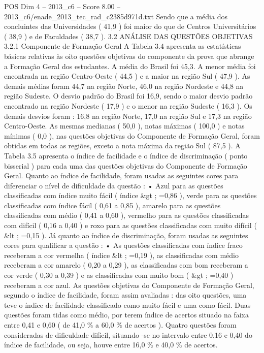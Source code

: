 \begin{textsample}{POS Dim 4 – 2013\_c6 – Score 8.00 – 2013\_c6/enade\_2013\_tec\_rad\_c2385d971d.txt}
Sendo que a média dos concluintes das Universidades ( 41,9 ) foi maior do que de Centros Universitários ( 38,9 ) e de Faculdades ( 38,7 ). 3.2 ANÁLISE DAS QUESTÕES OBJETIVAS 3.2.1 Componente de Formação Geral A Tabela 3.4 apresenta as estatísticas básicas relativas às oito questões objetivas do componente da prova que abrange a Formação Geral dos estudantes.
A média do Brasil foi 45,3.
A menor média foi encontrada na região Centro-Oeste ( 44,5 ) e a maior na região Sul ( 47,9 ).
As demais médias foram 44,7 na região Norte, 46,0 na região Nordeste e 44,8 na região Sudeste.
O desvio padrão do Brasil foi 16,9, sendo o maior desvio padrão encontrado na região Nordeste ( 17,9 ) e o menor na região Sudeste ( 16,3 ).
Os demais desvios foram : 16,8 na região Norte, 17,0 na região Sul e 17,3 na região Centro-Oeste.
As mesmas medianas ( 50,0 ), notas máximas ( 100,0 ) e notas mínimas ( 0,0 ), nas questões objetivas do Componente de Formação Geral, foram obtidas em todas as regiões, exceto a nota máxima da região Sul ( 87,5 ).
A Tabela 3.5 apresenta o índice de facilidade e o índice de discriminação ( ponto bisserial ) para cada uma das questões objetivas do Componente de Formação Geral.
Quanto ao índice de facilidade, foram usadas as seguintes cores para diferenciar o nível de dificuldade da questão : • Azul para as questões classificadas com índice muito fácil ( índice \&gt ; =0,86 ), verde para as questões classificadas com índice fácil ( 0,61 a 0,85 ), amarelo para as questões classificadas com médio ( 0,41 a 0,60 ), vermelho para as questões classificadas com difícil ( 0,16 a 0,40 ) e roxo para as questões classificadas com muito difícil ( \&lt ; =0,15 ).
Já quanto ao índice de discriminação, foram usadas as seguintes cores para qualificar a questão : • As questões classificadas com índice fraco receberam a cor vermelha ( índice \&lt ; =0,19 ), as classificadas com médio receberam a cor amarelo ( 0,20 a 0,29 ), as classificadas com bom receberam a cor verde ( 0,30 a 0,39 ) e as classificadas com muito bom ( \&gt ; =0,40 ) receberam a cor azul.
As questões objetivas do Componente de Formação Geral, segundo o índice de facilidade, foram assim avaliadas : das oito questões, uma teve o índice de facilidade classificado como muito fácil e uma como fácil.
Duas questões foram tidas como médio, por terem índice de acertos situado na faixa entre 0,41 e 0,60 ( de 41,0 \% a 60,0 \% de acertos ).
Quatro questões foram consideradas de dificuldade difícil, situando -se no intervalo entre 0,16 e 0,40 do índice de facilidade, ou seja, houve entre 16,0 \% e 40,0 \% de acertos.

\end{textsample}
